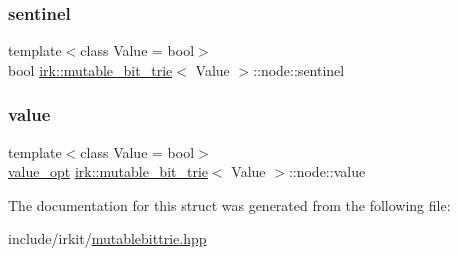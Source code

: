 \mbox{\label{structirk_1_1mutable__bit__trie_1_1node_a54f76adb0cab3a380ba75cc039065e4d}} 
\subsubsection{\texorpdfstring{sentinel}{sentinel}}
{\footnotesize\ttfamily template$<$class Value = bool$>$ \\
bool \mbox{\hyperlink{classirk_1_1mutable__bit__trie}{irk\+::mutable\+\_\+bit\+\_\+trie}}$<$ Value $>$\+::node\+::sentinel}

\mbox{\label{structirk_1_1mutable__bit__trie_1_1node_a1bacc998d6276431578e9ecb8f3dfa59}} 
\subsubsection{\texorpdfstring{value}{value}}
{\footnotesize\ttfamily template$<$class Value = bool$>$ \\
\mbox{\hyperlink{classirk_1_1mutable__bit__trie_a9a5ed79af3e7e28054b00c2284b35612}{value\+\_\+opt}} \mbox{\hyperlink{classirk_1_1mutable__bit__trie}{irk\+::mutable\+\_\+bit\+\_\+trie}}$<$ Value $>$\+::node\+::value}



The documentation for this struct was generated from the following file\+:\begin{DoxyCompactItemize}
\item 
include/irkit/\mbox{\hyperlink{mutablebittrie_8hpp}{mutablebittrie.\+hpp}}\end{DoxyCompactItemize}
